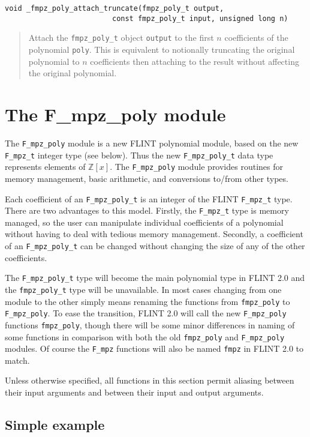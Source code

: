 \documentclass[a4paper,10pt]{article}
\newcommand{\Z}{\mathbb{Z}}
\newcommand{\code}{\lstinline}
\begin{document}
\begin{lstlisting}
void _fmpz_poly_attach_truncate(fmpz_poly_t output, 
                         const fmpz_poly_t input, unsigned long n)
\end{lstlisting}
\begin{quote}
Attach the \code{fmpz_poly_t} object \code{output} to the first $n$ coefficients of the polynomial \code{poly}. This is equivalent to notionally truncating the original polynomial to $n$ coefficients then attaching to the result without affecting the original polynomial.
\end{quote}

\section{The F\_mpz\_poly module}

The \code{F_mpz_poly} module is a new FLINT polynomial module, based on the new \code{F_mpz_t} integer type
(see below). Thus the new \code{F_mpz_poly_t} data type represents elements of $\Z[x]$. The \code{F_mpz_poly} 
module provides routines for memory management, basic arithmetic, and conversions to/from other types.

Each coefficient of an \code{F_mpz_poly_t} is an integer of the FLINT \code{F_mpz_t} type. There are two
advantages to this model. Firstly, the \code{F_mpz_t} type is memory managed, so the user can manipulate
individual coefficients of a polynomial without having to deal with tedious memory management. Secondly,
a coefficient of an \code{F_mpz_poly_t} can be changed without changing the size of any of the other
coefficients. 

The \code{F_mpz_poly_t} type will become the main polynomial type in FLINT 2.0 and the \code{fmpz_poly_t}
type will be unavailable. In most cases changing from one module to the other simply means renaming the
functions from \code{fmpz_poly} to \code{F_mpz_poly}. To ease the transition, FLINT 2.0 will call the 
new \code{F_mpz_poly} functions \code{fmpz_poly}, though there will be some minor differences in naming
of some functions in comparison with both the old \code{fmpz_poly} and \code{F_mpz_poly} modules. Of 
course the \code{F_mpz} functions will also be named \code{fmpz} in FLINT 2.0 to match.

Unless otherwise specified, all functions in this section permit aliasing between their input arguments 
and between their input and output arguments. 

\subsection{Simple example}
\end{document}

